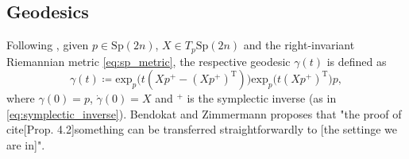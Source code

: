 \subsection{Geodesics}

Following \cite[Prop.~2.1]{BendokatZimmermann2021}, given $p\in \mathrm{Sp}(2n)$,  $X\in T_{p}\mathrm{Sp}(2n)$ and the right-invariant Riemannian metric \eqref{eq:sp_metric}, the respective geodesic $\gamma(t)$ is defined as
\begin{equation*}
    \gamma(t)\coloneqq \mathrm{exp}_{p}\big(t(Xp^{+}-(Xp^{+}) ^{\mathrm{T}})\big)\mathrm{exp}_{p}\big(t(Xp^{+})^{\mathrm{T}}\big)p,
\end{equation*}
where $\gamma(0)=p$, $\dot{\gamma}(0)=X$ and $^{+}$ is the symplectic inverse (as in \eqref{eq:symplectic_inverse}). Bendokat and Zimmermann proposes that "the proof of cite[Prop. 4.2]{something} can be transferred straightforwardly to [the settinge we are in]". 